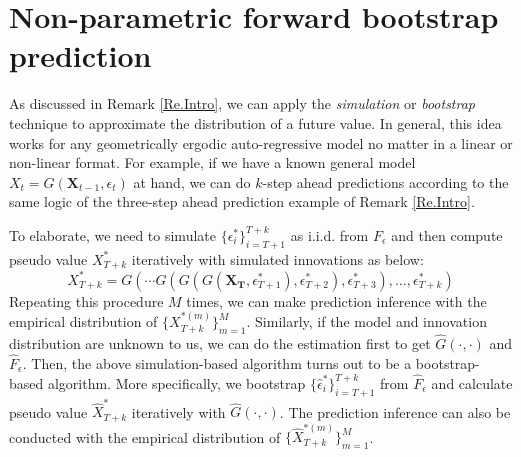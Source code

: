 \documentclass[a4paper]{article}
\begin{document}
\section{Non-parametric forward bootstrap prediction}\label{Sec:non-parametric_bootstrap}
 As  discussed in Remark \ref{Re.Intro}, we can apply the \textit{simulation} or \textit{bootstrap} technique to approximate the distribution of a future value. In general, this idea works for any geometrically ergodic auto-regressive model no matter in a linear or non-linear format. For example, if we have a known general model $X_{t} = G(\bm{X}_{t-1},\epsilon_t)$ at hand, we can do $k$-step ahead predictions according to the same logic of the three-step ahead prediction example of Remark \ref{Re.Intro}. 


To elaborate, we  need to simulate $\{\epsilon^*_i\}_{i=T+1}^{T+k}$ as i.i.d. from $F_{\epsilon}$ and then compute pseudo value $X_{T+k}^*$ iteratively with simulated innovations as below:
\begin{equation}\label{Eq:4}
    X^*_{T+k} =  G(\cdots G(G(G(\bm{X_T},\epsilon^*_{T+1}),\epsilon^*_{T+2}),\epsilon^*_{T+3}),\ldots,\epsilon^*_{T+k})
\end{equation}
Repeating this procedure $M$ times, we can make prediction inference with the empirical distribution of $\{X^{*(m)}_{T+k}\}_{m=1}^{M}$. 
 Similarly, if the model and innovation distribution are unknown to us, we can do the estimation first to get $\widehat{G}(\cdot,\cdot)$ and $\widehat{F}_{\epsilon}$. Then, the above simulation-based algorithm turns out to be a bootstrap-based algorithm. More specifically, we bootstrap $\{\hat{\epsilon}^*_i\}_{i=T+1}^{T+k}$ from $\widehat{F}_{\epsilon}$ and calculate pseudo value $\widehat{X}_{T+k}^*$ iteratively with $\widehat{G}(\cdot,\cdot)$. The prediction inference can also be conducted with the empirical distribution of $\{\widehat{X}^{*(m)}_{T+k}\}_{m=1}^{M}$.
\end{document}
